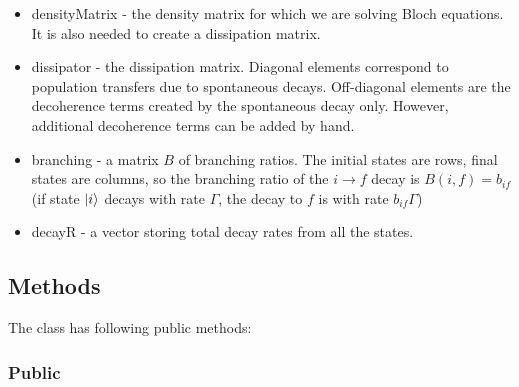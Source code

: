 \documentclass{article}
\numberwithin{equation}{section}
\numberwithin{figure}{section}
\numberwithin{table}{section}
\newcommand\codevar[1]{\ttfamily #1\rmfamily}
\begin{document}
\begin{itemize}

\item \codevar{densityMatrix} - the density matrix for which we are solving Bloch equations. It is also needed to create a dissipation matrix. 

\item \codevar{dissipator} - the dissipation matrix. Diagonal elements correspond to population transfers due to spontaneous decays. Off-diagonal elements are the decoherence terms created by the spontaneous decay only. However, additional decoherence terms can be added by hand.

\item \codevar{branching} - a matrix $B$ of branching ratios. The initial states are rows, final states are columns, so the branching ratio of the $i\rightarrow f$ decay is $B(i,f)=b_{if}$ (if state $\ket{i}$ decays with rate $\Gamma$, the decay to $f$ is with rate $b_{if}\Gamma$)
\item \codevar{decayR} - a vector storing total decay rates from all the states.

\end{itemize}


\subsection*{Methods}

The class has following public methods:

\subsubsection*{Public}
\end{document}
